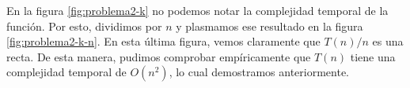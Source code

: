 En la figura \ref{fig:problema2-k} no podemos notar la complejidad temporal de la función. Por esto, dividimos por $n$ y plasmamos ese resultado en la figura \ref{fig:problema2-k-n}. En esta última figura, vemos claramente que $T(n) / n$ es una recta. De esta manera, pudimos comprobar empíricamente que $T(n)$ tiene una complejidad temporal de $O(n^2)$, lo cual demostramos anteriormente.